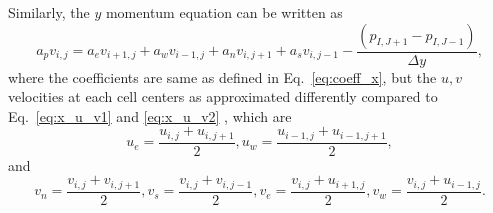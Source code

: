 \documentclass{article}
\numberwithin{equation}{section}
\numberwithin{figure}{section}
\begin{document}
Similarly, the $y$ momentum equation can be written as
\begin{equation}
    a_p v_{i,j} = a_e v_{i+1,j} + a_w v_{i-1,j} +a_n v_{i,j+1} +a_s v_{i,j-1} -  \frac{(p_{I,J+1}-p_{I,J-1})}{\Delta y},
    \label{eq:y_u_v3}
\end{equation}
where the coefficients are same as defined in Eq.~\ref{eq:coeff_x}, but  the $u, v$ velocities at each cell centers as approximated differently compared to Eq.~\ref{eq:x_u_v1} and \ref{eq:x_u_v2} , which are 
\begin{equation}
    u_e = \frac{u_{i,j}+u_{i,j+1}}{2}, u_w = \frac{u_{i-1,j}+u_{i-1,j+1}}{2},
    \label{eq:y_u_v}
\end{equation}
and
\begin{equation}
    v_n = \frac{v_{i,j}+v_{i,j+1}}{2}, v_s = \frac{v_{i,j}+v_{i,j-1}}{2},v_e = \frac{v_{i,j}+u_{i+1,j}}{2}, v_w = \frac{v_{i,j}+u_{i-1,j}}{2} .
\end{equation}
\end{document}
